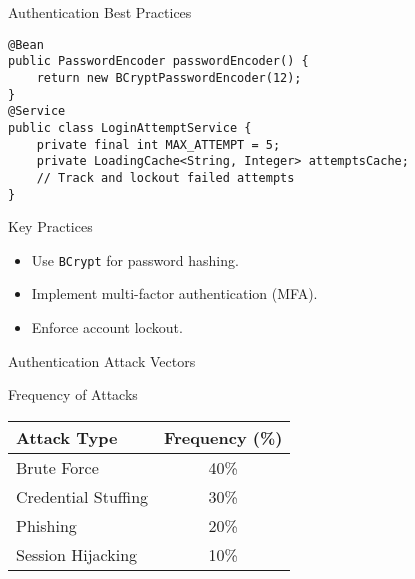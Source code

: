 \documentclass[12pt]{beamer}
\begin{document}
\begin{frame}[fragile]{Authentication Best Practices}
  \begin{lstlisting}[style=javastyle]
@Bean
public PasswordEncoder passwordEncoder() {
    return new BCryptPasswordEncoder(12);
}
@Service
public class LoginAttemptService {
    private final int MAX_ATTEMPT = 5;
    private LoadingCache<String, Integer> attemptsCache;
    // Track and lockout failed attempts
}
  \end{lstlisting}
  \begin{block}{Key Practices}
    \begin{itemize}
      \item Use \texttt{BCrypt} for password hashing.
      \item Implement multi-factor authentication (MFA).
      \item Enforce account lockout.
    \end{itemize}
  \end{block}
\end{frame}

\begin{frame}{Authentication Attack Vectors}
  \begin{block}{Frequency of Attacks}
    \begin{tabular}{|l|c|}
      \hline
      \textbf{Attack Type} & \textbf{Frequency (\%)} \\ \hline
      Brute Force & 40\% \\ \hline
      Credential Stuffing & 30\% \\ \hline
      Phishing & 20\% \\ \hline
      Session Hijacking & 10\% \\ \hline
    \end{tabular}
  \end{block}
\end{frame}
\end{document}
